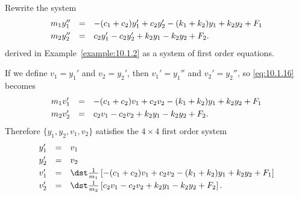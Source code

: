 \setcounter{example}{3}
\setcounter{equation}{15}
\begin{example}
  \label{example:10.1.4} \rm Rewrite the system
  \begin{equation}
    \label{eq:10.1.16}
    \begin{array}{rcl}
      m_{1}y_{1}'' & = & -(c_{1}+c_{2})y_{1}'+c_{2}y_{2}'-(k_{1}+k_{2})y_{1}+k_{2}y_{2}+F_{1} \\[1\jot]
      m_{2}y_{2}'' & = & c_{2}y_{1}'-c_{2}y_{2}'+k_{2}y_{1}-k_{2}y_{2}+F_{2}.
    \end{array}
  \end{equation}
  derived in Example~\ref{example:10.1.2} as a system of first order equations.
\end{example}
\setcounter{equation}{16}
\begin{examplesolution}
\solution{} If we define $v_{1}=y_{1}'$ and $v_{2}=y_{2}'$, then $v_{1}'=y_{1}''$ and
$v_{2}'=y_{2}''$, so \eqref{eq:10.1.16} becomes
\[
  \begin{array}{rcl}
    m_{1}v_{1}' & = & -(c_{1}+c_{2})v_{1}+c_{2}v_{2}-(k_{1}+k_{2})y_{1}+k_{2}y_{2}+F_{1} \\[1\jot]
    m_{2}v_{2}' & = & c_{2}v_{1}-c_{2}v_{2}+k_{2}y_{1}-k_{2}y_{2}+F_{2}.
  \end{array}
\]
Therefore $\{y_{1},y_{2},v_{1},v_{2}\}$ satisfies the $4\times4$ first order system
\begin{equation}
  \label{eq:10.1.17}
  \begin{array}{rcl}
    y_{1}' & = & v_{1}                                                                                              \\[1\jot]
    y_{2}' & = & v_{2}                                                                                              \\[1\jot]
    v_{1}' & = & \dst\frac{1}{m_{1}}\left[-(c_{1}+c_{2})v_{1}+c_{2}v_{2}-(k_{1}+k_{2})y_{1}+k_{2}y_{2}+F_{1}\right] \\[1\jot]
    v_{2}' & = & \dst\frac{1}{m_{2}}\left[c_{2}v_{1}-c_{2}v_{2}+k_{2}y_{1}-k_{2}y_{2}+F_{2}\right].
  \end{array}
\end{equation}

\relax
{}
\color{black}
\end{examplesolution}


